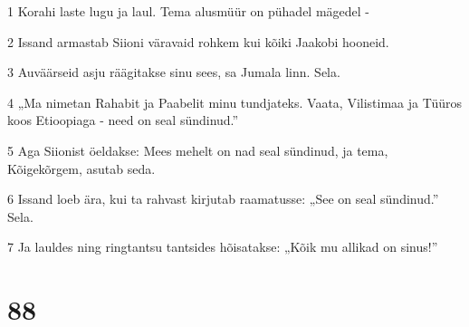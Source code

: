 \par 1 Korahi laste lugu ja laul. Tema alusmüür on pühadel mägedel -
\par 2 Issand armastab Siioni väravaid rohkem kui kõiki Jaakobi hooneid.
\par 3 Auväärseid asju räägitakse sinu sees, sa Jumala linn. Sela.
\par 4 „Ma nimetan Rahabit ja Paabelit minu tundjateks. Vaata, Vilistimaa ja Tüüros koos Etioopiaga - need on seal sündinud.”
\par 5 Aga Siionist öeldakse: Mees mehelt on nad seal sündinud, ja tema, Kõigekõrgem, asutab seda.
\par 6 Issand loeb ära, kui ta rahvast kirjutab raamatusse: „See on seal sündinud.” Sela.
\par 7 Ja lauldes ning ringtantsu tantsides hõisatakse: „Kõik mu allikad on sinus!”

\chapter{88}

